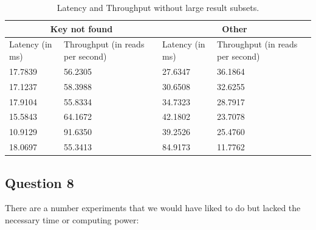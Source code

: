 \documentclass[12pt,a4paper]{article}
\begin{document}
\begin{table}
\caption{Latency and Throughput without large result subsets.}
\centering
\begin{tabular}{|p{}|p{}|p{}|p{}|}
\hline
\multicolumn{2}{|c|}{Key not found} & \multicolumn{2}{|c|}{Other} \\ \hline
Latency (in ms) & Throughput (in reads per second) & Latency (in ms) & Throughput (in reads per second) \\ \hline
17.7839 & 56.2305 & 27.6347 & 36.1864 \\ \hline
17.1237 & 58.3988 & 30.6508 & 32.6255 \\ \hline
17.9104 & 55.8334 & 34.7323 & 28.7917 \\ \hline
15.5843 & 64.1672 & 42.1802 & 23.7078 \\ \hline
10.9129 & 91.6350 & 39.2526 & 25.4760 \\ \hline
18.0697 & 55.3413 & 84.9173 & 11.7762 \\ \hline
\end{tabular}
\label{tab:other}
\end{table}

\subsection*{Question 8}
\label{sec:pq8}
There are a number experiments that we would have liked to do but lacked the necessary time or computing power:
\end{document}
